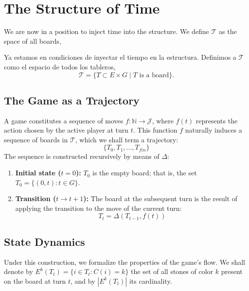 \section{The Structure of Time}

We are now in a position to inject time into the structure. We define \(\mathcal{T}\) as the space of all boards,

Ya estamos en condiciones de inyectar el tiempo en la estructura. Definimos a $\mathcal{T}$ como el espacio de todos los tableros,
$$ \mathcal{T} = \{ T \subset E \times G \mid T \text{ is a board}\}.$$

\subsection{The Game as a Trajectory}
A game constitutes a sequence of moves $f:\mathbb{N} \rightarrow \mathcal{J}$, where $f(t)$ represents the action chosen by the active player at turn $t$. This function $f$ naturally induces a sequence of boards in $\mathcal{T}$, which we shall term a trajectory:
$$\{T_0, T_1, \dots, T_{fin}\}$$
The sequence is constructed recursively by means of $\Delta$:

\begin{enumerate}
	\item \textbf{Initial state (\(t=0\)):} \(T_0\) is the empty board; that is, the set \(T_0 = \{(0, t) : t \in G\}\).
	\item \textbf{Transition (\(t \rightarrow t+1\)):} The board at the subsequent turn is the result of applying the transition to the move of the current turn:
	$$T_t = \Delta(T_{t-1}, f(t))$$
	\end{enumerate}

\subsection{State Dynamics}

Under this construction, we formalize the properties of the game's flow. We shall denote by \(E^k(T_t) = \{i \in T_t : C(i) = k\}\) the set of all stones of color \(k\) present on the board at turn \(t\), and by \(|E^k(T_t)|\) its cardinality.

